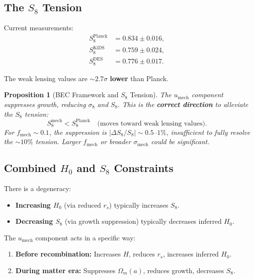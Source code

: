 \documentclass[11pt,a4paper]{article}
\newcommand{\umech}{\ensuremath{u_{\mathrm{mech}}}}
\newcommand{\fmech}{\ensuremath{f_{\mathrm{mech}}}}
\newcommand{\sigmamech}{\ensuremath{\sigma_{\mathrm{mech}}}}
\newcommand{\rs}{\ensuremath{r_s}}
\newtheorem{proposition}[theorem]{Proposition}
\theoremstyle{definition}
\theoremstyle{remark}
\begin{document}
\subsection{The $S_8$ Tension}
\label{sec:S8_tension}

Current measurements:
\begin{align}
S_8^{\mathrm{Planck}} &= 0.834 \pm 0.016, \\
S_8^{\mathrm{KiDS}} &= 0.759 \pm 0.024, \\
S_8^{\mathrm{DES}} &= 0.776 \pm 0.017.
\end{align}

The weak lensing values are $\sim 2.7\sigma$ \textbf{lower} than Planck.

\begin{proposition}[BEC Framework and $S_8$ Tension]
\label{prop:S8_alleviation}
The $\umech$ component suppresses growth, reducing $\sigma_8$ and $S_8$. This is the \textbf{correct direction} to alleviate the $S_8$ tension:
\begin{equation}
S_8^{\mathrm{mech}} < S_8^{\mathrm{Planck}} \quad \text{(moves toward weak lensing values)}.
\end{equation}
For $\fmech \sim 0.1$, the suppression is $|\Delta S_8/S_8| \sim 0.5$--$1\%$, insufficient to fully resolve the $\sim 10\%$ tension. Larger $\fmech$ or broader $\sigmamech$ could be significant.
\end{proposition}

\subsection{Combined $H_0$ and $S_8$ Constraints}
\label{sec:combined_constraints}

There is a degeneracy:
\begin{itemize}[leftmargin=*, itemsep=0.2em]
\item \textbf{Increasing $H_0$} (via reduced $\rs$) typically increases $S_8$.
\item \textbf{Decreasing $S_8$} (via growth suppression) typically decreases inferred $H_0$.
\end{itemize}

The $\umech$ component acts in a specific way:
\begin{enumerate}[leftmargin=*, itemsep=0.2em]
\item \textbf{Before recombination:} Increases $H$, reduces $\rs$, increases inferred $H_0$.
\item \textbf{During matter era:} Suppresses $\Omega_m(a)$, reduces growth, decreases $S_8$.
\end{enumerate}
\end{document}
